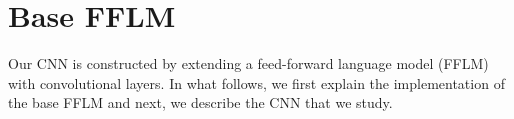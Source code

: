 



\section{Base FFLM}

Our CNN is constructed by extending a feed-forward language model (FFLM) with convolutional layers. In what follows, we first explain the implementation of the base FFLM and next, we describe the CNN that we study.


